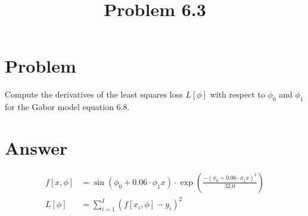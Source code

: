 \documentclass{article}
\title{Problem 6.3}
\begin{document}
\section{Problem}

Compute the derivatives of the least squares loss $ L [ \phi ] $  with respect to $ \phi_0 $ and $\phi_1$ for the Gabor model equation 6.8. 

\section{Answer}

\begin{align}
    f[x,\phi] &= \sin(\phi_0 + 0.06 \cdot \phi_1x) \cdot \exp  \left( \frac{-(\phi_0 + 0.06 \cdot \phi_1x)^2}{32.0} \right)
    \\
    L[\phi]   &= \sum_{i=1}^{I} (f[x_i, \phi]-y_i)^2
\end{align}
\end{document}
